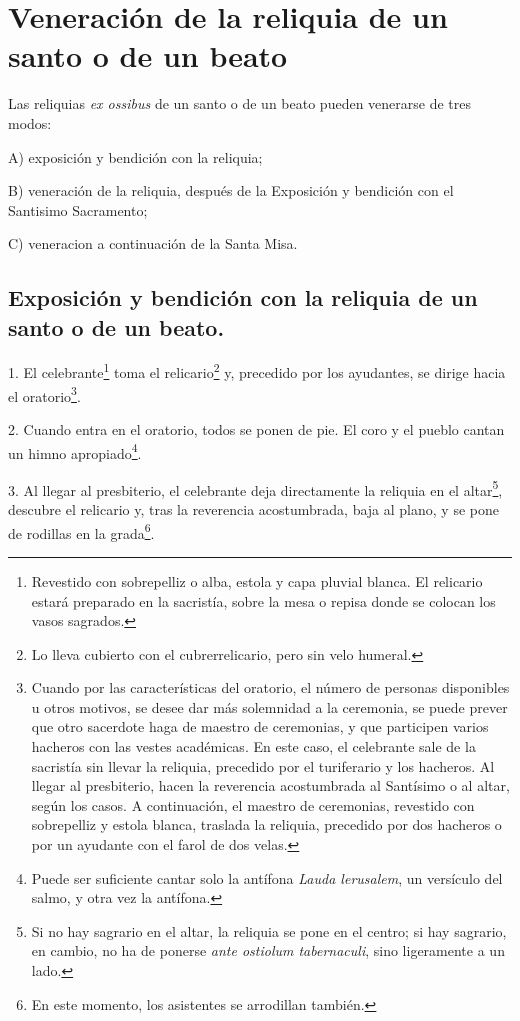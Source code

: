 \section[Veneración de una reliquia]{Veneración de la reliquia de un santo o de un beato}


Las reliquias\emph{ ex ossibus} de un santo o de un beato pueden venerarse de tres modos:

A) exposición y bendición con la reliquia;

B) veneración de la reliquia, después de la Exposición y bendición con el Santisimo Sacramento;

C) veneracion a continuación de la Santa Misa.

\subsection[Exposición y bendición con la reliquia ]{Exposición y bendición con la reliquia de un santo o de un beato.}

1. El  celebrante\footnote{Revestido con sobrepelliz o alba, estola y capa pluvial blanca. El relicario estará preparado en la sacristía, sobre la mesa o repisa donde se colocan los vasos sagrados.} 
 toma el relicario\footnote{Lo lleva cubierto con el cubrerrelicario, pero sin velo humeral.} y, precedido por los ayudantes, se dirige hacia el oratorio\footnote{Cuando por las características del oratorio, el número de personas disponibles u otros motivos, se desee dar más solemnidad a la ceremonia, se puede prever que otro sacerdote haga de maestro de ceremonias, y que participen varios hacheros con las vestes académicas. En este caso, el celebrante sale de la sacristía sin llevar la reliquia, precedido por el turiferario y los hacheros. Al llegar al presbiterio, hacen la reverencia acostumbrada al Santísimo o al altar, según los casos. A continuación, el maestro de ceremonias, revestido con sobrepelliz y estola blanca, traslada la reliquia, precedido por dos hacheros o por un ayudante con el farol de dos velas.}.

2. Cuando entra en el oratorio, todos se ponen de pie. El coro y el pueblo cantan un himno apropiado\footnote{Puede ser suficiente cantar solo la antífona \emph{Lauda lerusalem}, un versículo del salmo, y otra vez la antífona.}.

3.	Al llegar al presbiterio, el celebrante deja directamente la reliquia en el 
altar\footnote{Si no hay sagrario en el altar, la reliquia se pone en el centro; si hay sagrario, en cambio, no ha de ponerse \emph{ante ostiolum tabernaculi}, sino ligeramente a un lado.}, descubre el relicario y, tras la reverencia acostumbrada, baja al plano, y se pone de rodillas en la grada\footnote{En este momento, los asistentes se arrodillan también. }.

